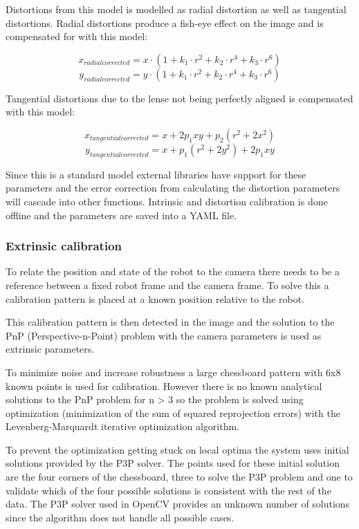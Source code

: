 Distortions from this model is modelled as radial distortion as well as tangential distortions. Radial distortions produce a fish-eye effect on the image and is compensated for with this model:

\[x_{radialcorrected} = x\cdot (1+k_1\cdot r^2 + k_2\cdot r^4 + k_3\cdot r^6)\]
\[y_{radialcorrected} = y\cdot (1+k_1\cdot r^2 + k_2\cdot r^4 + k_3\cdot r^6)\]

Tangential distortions due to the lense not being perfectly aligned is compensated with this model:

\[x_{tangentialcorrected} = x + 2p_1xy+p_2(r^2+2x^2)\]
\[y_{tangentialcorrected} = x + p_1(r^2+2y^2)+2p_1xy\]

Since this is a standard model external libraries have support for these parameters and the error correction from calculating the distortion parameters will cascade into other functions. Intrinsic and distortion calibration is done offline and the parameters are saved into a YAML file.

\subsubsection{Extrinsic calibration}
To relate the position and state of the robot to the camera there needs to be a reference between a fixed robot frame and the camera frame. To solve this a calibration pattern is placed at a known position relative to the robot.

This calibration pattern is then detected in the image and the solution to the PnP (Perspective-n-Point) problem with the camera parameters is used as extrinsic parameters.

To minimize noise and increase robustness a large chessboard pattern with 6x8 known points is used for calibration. However there is no known analytical solutions to the PnP problem for n > 3 so the problem is solved using optimization (minimization of the sum of squared reprojection errors) with the Levenberg-Marquardt iterative optimization algorithm.

To prevent the optimization getting stuck on local optima the system uses initial solutions provided by the P3P solver.
The points used for these initial solution are the four corners of the chessboard, three to solve the P3P problem and one to validate which of the four possible solutions is consistent with the rest of the data.
The P3P solver used in OpenCV provides an unknown number of solutions since the algorithm does not handle all possible cases. 

